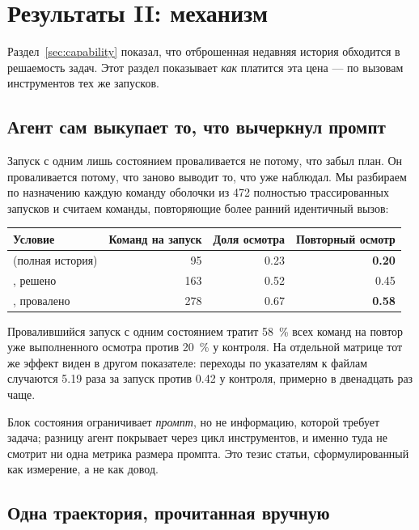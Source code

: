 \section{Результаты II: механизм}
\label{sec:mechanism}

Раздел~\ref{sec:capability} показал, что отброшенная недавняя история
обходится в решаемость задач. Этот раздел показывает \emph{как} платится
эта цена — по вызовам инструментов тех же запусков.

\subsection{Агент сам выкупает то, что вычеркнул промпт}

Запуск с одним лишь состоянием проваливается не потому, что забыл план. Он
проваливается потому, что заново выводит то, что уже наблюдал. Мы разбираем
по назначению каждую команду оболочки из 472 полностью трассированных
запусков и считаем команды, повторяющие более ранний идентичный
вызов\live:

\begin{center}
\begin{tabular}{@{}lrrr@{}}
\toprule
Условие & Команд на запуск & Доля осмотра & \textbf{Повторный осмотр} \\
\midrule
\Control{} (полная история) & 95  & 0.23 & \textbf{0.20} \\
\StateOnly{}, решено      & 163 & 0.52 & 0.45 \\
\StateOnly{}, провалено      & 278 & 0.67 & \textbf{0.58} \\
\bottomrule
\end{tabular}
\end{center}

Провалившийся запуск с одним состоянием тратит \SI{58}{\percent} всех команд
на повтор уже выполненного осмотра против \SI{20}{\percent} у контроля. На
отдельной матрице тот же эффект виден в другом показателе: переходы по
указателям к файлам случаются 5.19 раза за запуск против 0.42 у контроля,
примерно в двенадцать раз чаще\live.

Блок состояния ограничивает \emph{промпт}, но не информацию, которой
требует задача; разницу агент покрывает через цикл инструментов, и именно
туда не смотрит ни одна метрика размера промпта. Это тезис статьи,
сформулированный как измерение, а не как довод.

\subsection{Одна траектория, прочитанная вручную}


